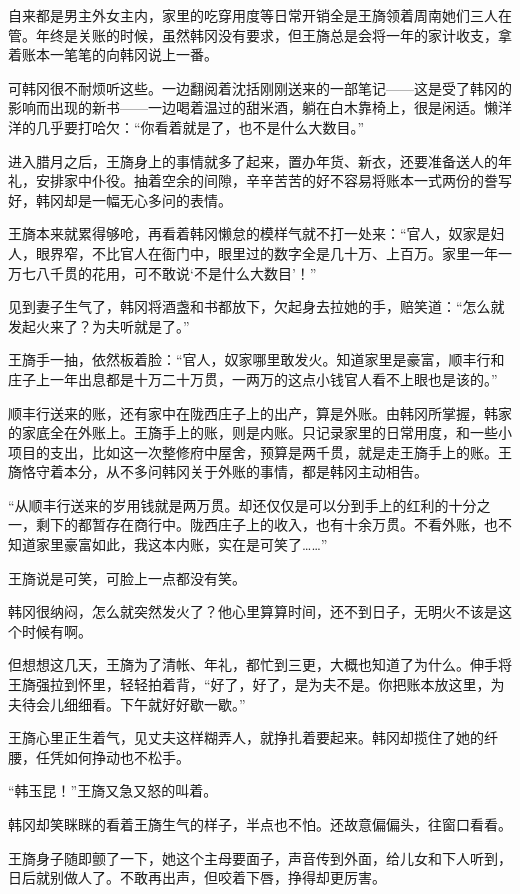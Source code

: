 自来都是男主外女主内，家里的吃穿用度等日常开销全是王旖领着周南她们三人在管。年终是关账的时候，虽然韩冈没有要求，但王旖总是会将一年的家计收支，拿着账本一笔笔的向韩冈说上一番。

可韩冈很不耐烦听这些。一边翻阅着沈括刚刚送来的一部笔记——这是受了韩冈的影响而出现的新书——一边喝着温过的甜米酒，躺在白木靠椅上，很是闲适。懒洋洋的几乎要打哈欠：“你看着就是了，也不是什么大数目。”

进入腊月之后，王旖身上的事情就多了起来，置办年货、新衣，还要准备送人的年礼，安排家中仆役。抽着空余的间隙，辛辛苦苦的好不容易将账本一式两份的誊写好，韩冈却是一幅无心多问的表情。

王旖本来就累得够呛，再看着韩冈懒怠的模样气就不打一处来：“官人，奴家是妇人，眼界窄，不比官人在衙门中，眼里过的数字全是几十万、上百万。家里一年一万七八千贯的花用，可不敢说‘不是什么大数目’！”

见到妻子生气了，韩冈将酒盏和书都放下，欠起身去拉她的手，赔笑道：“怎么就发起火来了？为夫听就是了。”

王旖手一抽，依然板着脸：“官人，奴家哪里敢发火。知道家里是豪富，顺丰行和庄子上一年出息都是十万二十万贯，一两万的这点小钱官人看不上眼也是该的。”

顺丰行送来的账，还有家中在陇西庄子上的出产，算是外账。由韩冈所掌握，韩家的家底全在外账上。王旖手上的账，则是内账。只记录家里的日常用度，和一些小项目的支出，比如这一次整修府中屋舍，预算是两千贯，就是走王旖手上的账。王旖恪守着本分，从不多问韩冈关于外账的事情，都是韩冈主动相告。

“从顺丰行送来的岁用钱就是两万贯。却还仅仅是可以分到手上的红利的十分之一，剩下的都暂存在商行中。陇西庄子上的收入，也有十余万贯。不看外账，也不知道家里豪富如此，我这本内账，实在是可笑了……”

王旖说是可笑，可脸上一点都没有笑。

韩冈很纳闷，怎么就突然发火了？他心里算算时间，还不到日子，无明火不该是这个时候有啊。

但想想这几天，王旖为了清帐、年礼，都忙到三更，大概也知道了为什么。伸手将王旖强拉到怀里，轻轻拍着背，“好了，好了，是为夫不是。你把账本放这里，为夫待会儿细细看。下午就好好歇一歇。”

王旖心里正生着气，见丈夫这样糊弄人，就挣扎着要起来。韩冈却揽住了她的纤腰，任凭如何挣动也不松手。

“韩玉昆！”王旖又急又怒的叫着。

韩冈却笑眯眯的看着王旖生气的样子，半点也不怕。还故意偏偏头，往窗口看看。

王旖身子随即颤了一下，她这个主母要面子，声音传到外面，给儿女和下人听到，日后就别做人了。不敢再出声，但咬着下唇，挣得却更厉害。

